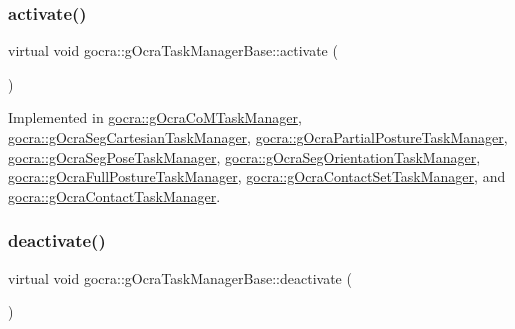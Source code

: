 \subsubsection{\texorpdfstring{activate()}{activate()}}
{\footnotesize\ttfamily virtual void gocra\+::g\+Ocra\+Task\+Manager\+Base\+::activate (\begin{DoxyParamCaption}{ }\end{DoxyParamCaption})\hspace{0.3cm}{\ttfamily [pure virtual]}}



Implemented in \hyperlink{classgocra_1_1gOcraCoMTaskManager_a0a2649bf8ce377a8af44e13a3571f670}{gocra\+::g\+Ocra\+Co\+M\+Task\+Manager}, \hyperlink{classgocra_1_1gOcraSegCartesianTaskManager_ad10f6192fd628de724bd923770bd632e}{gocra\+::g\+Ocra\+Seg\+Cartesian\+Task\+Manager}, \hyperlink{classgocra_1_1gOcraPartialPostureTaskManager_ad33a136127d9cdb480748954dc0fd038}{gocra\+::g\+Ocra\+Partial\+Posture\+Task\+Manager}, \hyperlink{classgocra_1_1gOcraSegPoseTaskManager_a0fdbbb5fc40c89253fa9d9c83e8aaecc}{gocra\+::g\+Ocra\+Seg\+Pose\+Task\+Manager}, \hyperlink{classgocra_1_1gOcraSegOrientationTaskManager_aafe5bc35406c5d99288d05d6468e041f}{gocra\+::g\+Ocra\+Seg\+Orientation\+Task\+Manager}, \hyperlink{classgocra_1_1gOcraFullPostureTaskManager_a24c2b63ff065c8d7b056ccadddf55b59}{gocra\+::g\+Ocra\+Full\+Posture\+Task\+Manager}, \hyperlink{classgocra_1_1gOcraContactSetTaskManager_a0fb5ccaae21c77073a6d0f310fe543a4}{gocra\+::g\+Ocra\+Contact\+Set\+Task\+Manager}, and \hyperlink{classgocra_1_1gOcraContactTaskManager_a51eef1bcdf87285b5b731356c6b46727}{gocra\+::g\+Ocra\+Contact\+Task\+Manager}.

\hypertarget{classgocra_1_1gOcraTaskManagerBase_a7cf9111e69aee47a39fe0f2976a20d6c}{}\label{classgocra_1_1gOcraTaskManagerBase_a7cf9111e69aee47a39fe0f2976a20d6c} 
\subsubsection{\texorpdfstring{deactivate()}{deactivate()}}
{\footnotesize\ttfamily virtual void gocra\+::g\+Ocra\+Task\+Manager\+Base\+::deactivate (\begin{DoxyParamCaption}{ }\end{DoxyParamCaption})\hspace{0.3cm}{\ttfamily [pure virtual]}}



